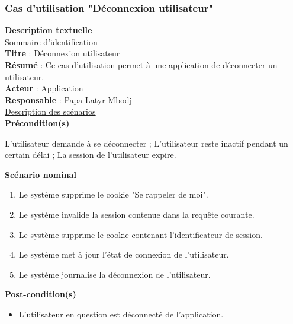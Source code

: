 \subsubsection{Cas d'utilisation "Déconnexion utilisateur"}
\textbf{\RIGHTarrow Description textuelle}\\
\underline{\underline{Sommaire d’identification}} \\
\textbf{Titre} : Déconnexion utilisateur\\
\textbf{Résumé} : Ce cas d’utilisation permet à une application de déconnecter un utilisateur.\\
\textbf{Acteur} : Application\\	
\textbf{Responsable} : Papa Latyr Mbodj\\
\underline{\underline{Description des scénarios}}\\
\textbf{Précondition(s)}
\begin{itemize}
	\itemtirait L'utilisateur demande à se déconnecter ;
	\itemtirait L'utilisateur reste inactif pendant un certain délai ;
	\itemtirait La session de l'utilisateur expire.
\end{itemize}
\textbf{Scénario nominal}
\begin{enumerate}
	\item Le système supprime le cookie "Se rappeler de moi".
	\item Le système invalide la session contenue dans la requête courante.
	\item Le système supprime le cookie contenant l'identificateur de session.
	\item Le système met à jour l'état de connexion de l'utilisateur.
	\item Le système journalise la déconnexion de l'utilisateur.
\end{enumerate}
\textbf{Post-condition(s)}
\begin{itemize}
	\item L’utilisateur en question est déconnecté de l'application.
\end{itemize}

